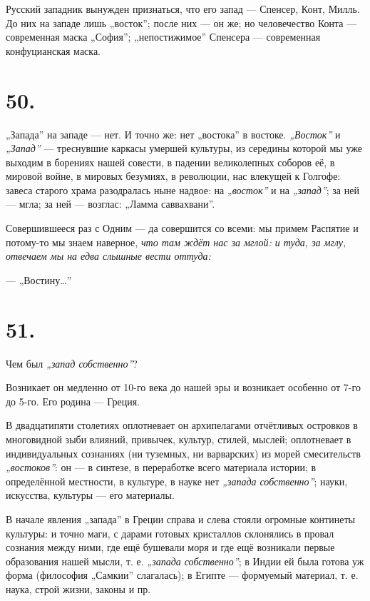 \documentclass[12pt,a4paper,oneside]{book}
\begin{document}
Русский западник вынужден признаться, что его запад — Спенсер, Конт, Милль. До них на западе лишь „восток”; после них — он же; но человечество Конта — современная маска „София”; „непостижимое” Спенсера — современная конфуцианская маска.

\section*{50.}

„Запада” на западе — нет. И точно же: нет „востока” в востоке. \emph{„Восток”} и \emph{„Запад”} — треснувшие каркасы умершей культуры, из середины которой мы уже выходим в борениях нашей совести, в падении великолепных соборов её, в мировой войне, в мировых безумиях, в революции, нас влекущей к Голгофе: завеса старого храма разодралась ныне надвое: на \emph{„восток”} и на \emph{„запад”}; за ней — мгла; за ней — возглас: „Ламма саввахвани”.

Совершившееся раз с Одним — да совершится со всеми: мы примем Распятие и потому-то мы знаем наверное, \emph{что там ждёт нас за мглой: и туда, за мглу, отвечаем мы на едва слышные вести оттуда:}

— „Востину…”

\section*{51.}

Чем был \emph{„запад собственно”}?

Возникает он медленно от 10-го века до нашей эры и возникает особенно от 7-го до 5-го. Его родина — Греция.

В двадцатипяти столетиях оплотневает он архипелагами отчётливых островков в многовидной зыби влияний, привычек, культур, стилей, мыслей; оплотневает в индивидуальных сознаниях (ни туземных, ни варварских) из морей смесительств \emph{„востоков”}: он — в синтезе, в переработке всего материала истории; в определённой местности, в культуре, в науке нет \emph{„запада собственно”}; науки, искусства, культуры — его материалы.

В начале явления „запада” в Греции справа и слева стояли огромные континеты культуры: и точно маги, с дарами готовых кристаллов склонялись в провал сознания между ними, где ещё бушевали моря и где ещё возникали первые образования нашей мысли, т. е. \emph{„запада собственно”}; в Индии ей была готова уж форма (философия „Самкии” слагалась); в Египте — формуемый материал, т. е. наука, строй жизни, законы и пр.
\end{document}
